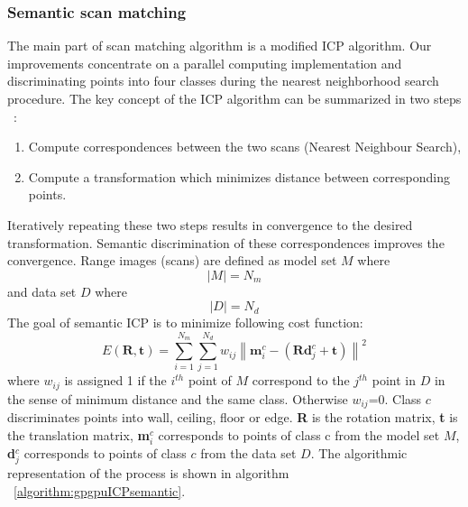 \documentclass{article}
\begin{document}
\subsubsection{Semantic scan matching}
The main part of scan matching algorithm is a modified ICP algorithm.
Our improvements concentrate on a parallel computing implementation and discriminating points into four classes during the nearest neighborhood search procedure.
The key concept of the ICP algorithm can be summarized in two steps ~\cite{Segal-RSS-09}:
\begin{enumerate}
\item Compute correspondences between the two scans (Nearest Neighbour Search),
\item Compute a transformation which minimizes distance between corresponding points.
\end{enumerate}
Iteratively repeating these two steps results in convergence to the desired transformation.
Semantic discrimination of these correspondences improves the convergence.
Range images (scans) are defined as model set $M$ where
\begin{equation}
|M|=N_m
\end{equation}
and data set $D$ where
\begin{equation}
|D|=N_d
\end{equation}
The goal of semantic ICP is to minimize following cost function:
\begin{equation}
\label{equation:errorfunc}
E\left ( \mathbf{R,t} \right )=\sum_{i=1}^{N_m}\sum_{j=1}^{N_d}w_{ij}\left \| \mathbf{m}_i^c-\left ( \mathbf{Rd}_j^c+\mathbf{t} \right ) \right \|^{2}
\end{equation}
where $w_{ij}$ is assigned 1 if the $i^{th}$ point of $M$ correspond to the $j^{th}$ point in $D$ in the sense of minimum distance and the same class.
Otherwise $w_{ij}$=0.
Class $c$ discriminates points into wall, ceiling, floor or edge.
{\bf R} is the rotation matrix, {\bf t} is the translation matrix, {\bf m}$_i^c$ corresponds to points of class c from the model set $M$, {\bf d}$_j^c$ corresponds to points of class $c$ from the data set $D$.
The algorithmic representation of the process is shown in algorithm ~\ref{algorithm:gpgpuICPsemantic}.
\end{document}
